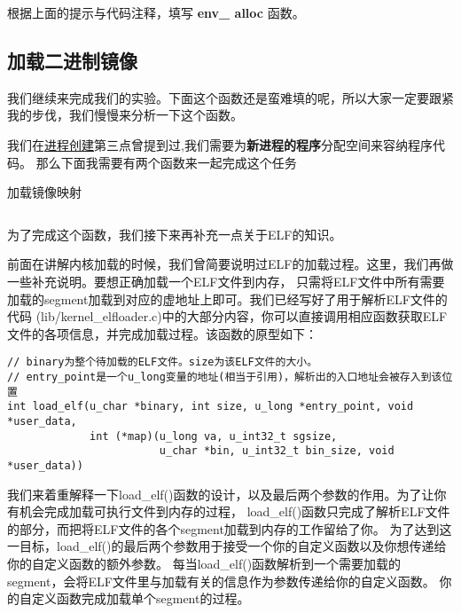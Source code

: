 \begin{exercise}
根据上面的提示与代码注释，填写 \textbf{env\_ alloc} 函数。
\end{exercise}




\subsection{加载二进制镜像}
我们继续来完成我们的实验。下面这个函数还是蛮难填的呢，所以大家一定要跟紧我的步伐，我们慢慢来分析一下这个函数。

我们在\hyperref[process-3]{进程创建}第三点曾提到过,我们需要为\textbf{新进程的程序}分配空间来容纳程序代码。
那么下面我需要有两个函数来一起完成这个任务

\begin{codeBoxWithCaption}{加载镜像映射\label{code:load_icode_mapper.c}}
  \inputminted[linenos]{c}{codes/load_icode_mapper.c}
\end{codeBoxWithCaption}

为了完成这个函数，我们接下来再补充一点关于ELF的知识。

前面在讲解内核加载的时候，我们曾简要说明过ELF的加载过程。这里，我们再做一些补充说明。要想正确加载一个ELF文件到内存，
只需将ELF文件中所有需要加载的segment加载到对应的虚地址上即可。我们已经写好了用于解析ELF文件的代码
(lib/kernel\_elfloader.c)中的大部分内容，你可以直接调用相应函数获取ELF文件的各项信息，并完成加载过程。该函数的原型如下：

\begin{verbatim}
// binary为整个待加载的ELF文件。size为该ELF文件的大小。
// entry_point是一个u_long变量的地址(相当于引用)，解析出的入口地址会被存入到该位置
int load_elf(u_char *binary, int size, u_long *entry_point, void *user_data,
             int (*map)(u_long va, u_int32_t sgsize,
                        u_char *bin, u_int32_t bin_size, void *user_data))
\end{verbatim}

我们来着重解释一下load\_elf()函数的设计，以及最后两个参数的作用。为了让你有机会完成加载可执行文件到内存的过程，
load\_elf()函数只完成了解析ELF文件的部分，而把将ELF文件的各个segment加载到内存的工作留给了你。
为了达到这一目标，load\_elf()的最后两个参数用于接受一个你的自定义函数以及你想传递给你的自定义函数的额外参数。
每当load\_elf()函数解析到一个需要加载的segment，会将ELF文件里与加载有关的信息作为参数传递给你的自定义函数。
你的自定义函数完成加载单个segment的过程。

